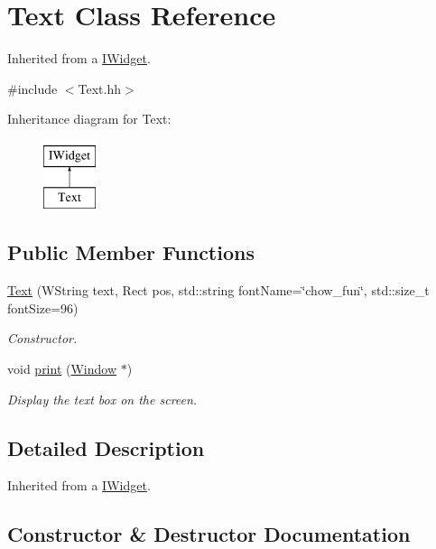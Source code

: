 \hypertarget{classText}{}\section{Text Class Reference}
\label{classText}


Inherited from a \hyperlink{classIWidget}{I\+Widget}.  




{\ttfamily \#include $<$Text.\+hh$>$}

Inheritance diagram for Text\+:\begin{figure}[H]
\begin{center}
\leavevmode
\includegraphics[height=2.000000cm]{classText}
\end{center}
\end{figure}
\subsection*{Public Member Functions}
\begin{DoxyCompactItemize}
\item 
\hyperlink{classText_a00ba9f4a2c3ca172e17433d2ceda4d55}{Text} (W\+String text, Rect pos, std\+::string font\+Name=\char`\"{}chow\+\_\+fun\char`\"{}, std\+::size\+\_\+t font\+Size=96)
\begin{DoxyCompactList}\small\item\em Constructor. \end{DoxyCompactList}\item 
void \hyperlink{classText_ab2be08831f604b8a957d540087ba4741}{print} (\hyperlink{classWindow}{Window} $\ast$)
\begin{DoxyCompactList}\small\item\em Display the text box on the screen. \end{DoxyCompactList}\end{DoxyCompactItemize}


\subsection{Detailed Description}
Inherited from a \hyperlink{classIWidget}{I\+Widget}. 

\subsection{Constructor \& Destructor Documentation}
\mbox{\label{classText_a00ba9f4a2c3ca172e17433d2ceda4d55}} 
